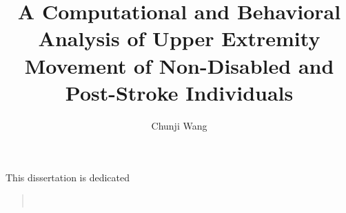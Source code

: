 \documentclass{report}
\begin{document}

\title{A Computational and Behavioral Analysis of Upper Extremity Movement of Non-Disabled and Post-Stroke Individuals}

\author{Chunji Wang}




\begin{preface}

    This dissertation is dedicated
     \begin{quote}
         \\
     \end{quote}

    

  \tableofcontents
  \listoftables
  \listoffigures

    
\end{preface}













\begin{singlespace}
  \appendix
%  
\end{singlespace}


\end{document}
